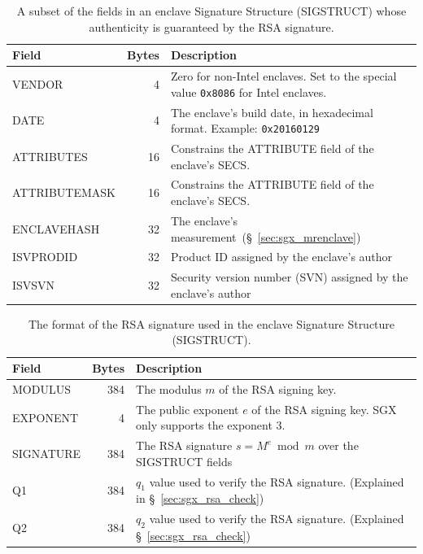 \begin{table}[hbt]
  \centering
  \begin{tabularx}{\textwidth}{| l | r | X |}
  \hline
  \textbf{Field} & \textbf{Bytes} & \textbf{Description} \\
  \hline
  VENDOR & 4 & Zero for non-Intel enclaves. Set to the special value
               \texttt{0x8086} for Intel enclaves.  \\
  \hline
  DATE & 4 & The enclave's build date, in hexadecimal format. Example:
             \texttt{0x20160129} \\
  \hline
  ATTRIBUTES & 16 & Constrains the ATTRIBUTE field of the enclave's SECS. \\
  \hline
  ATTRIBUTEMASK & 16 & Constrains the ATTRIBUTE field of the enclave's SECS. \\
  \hline
  ENCLAVEHASH & 32 & The enclave's measurement~(\S~\ref{sec:sgx_mrenclave}) \\
  \hline
  ISVPRODID & 32 & Product ID assigned by the enclave's author \\
  \hline
  ISVSVN & 32 & Security version number (SVN) assigned by the enclave's
                author \\
  \hline
  \end{tabularx}
  \caption{
    A subset of the fields in an enclave Signature Structure (SIGSTRUCT) whose
    authenticity is guaranteed by the RSA signature.
  }
  \label{fig:sgx_sigstruct_info}
\end{table}

\begin{table}[hbt]
  \centering
  \begin{tabularx}{\textwidth}{| l | r | X |}
  \hline
  \textbf{Field} & \textbf{Bytes} & \textbf{Description} \\
  \hline
  MODULUS & 384 & The modulus $m$ of the RSA signing key. \\
  \hline
  EXPONENT & 4 & The public exponent $e$ of the RSA signing key. SGX only
                 supports the exponent 3. \\
  \hline
  SIGNATURE & 384 & The RSA signature $s = M ^ e \bmod m$ over the SIGSTRUCT
                    fields \\
  \hline
  Q1 & 384 & $q_1$ value used to verify the RSA signature.
             (Explained in \S~\ref{sec:sgx_rsa_check}) \\
  \hline
  Q2 & 384 & $q_2$ value used to verify the RSA signature.
             (Explained \S~\ref{sec:sgx_rsa_check}) \\
  \hline
  \end{tabularx}
  \caption{
    The format of the RSA signature used in the enclave Signature Structure
    (SIGSTRUCT).
  }
  \label{fig:sgx_sigstruct_rsa}
\end{table}


